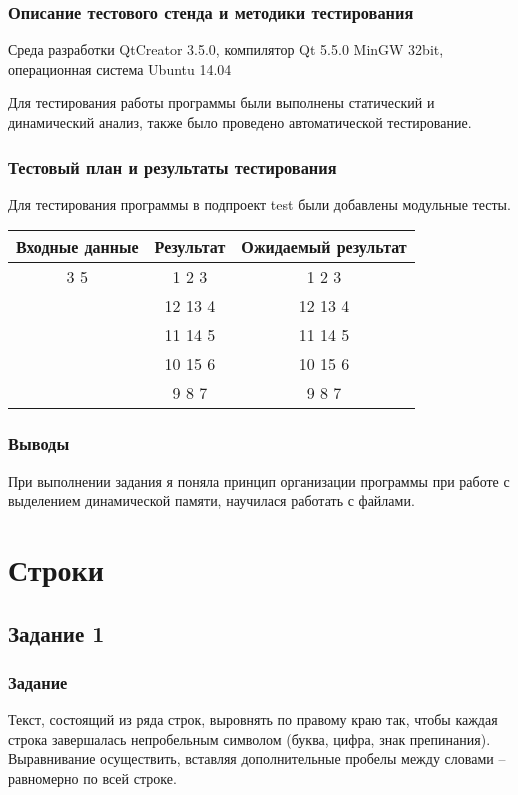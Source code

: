 \documentclass[12pt,a4paper]{report}
\begin{document}
\subsection{Описание тестового стенда и методики тестирования}
Среда разработки QtCreator 3.5.0, компилятор Qt 5.5.0 MinGW 32bit, операционная система Ubuntu 14.04

Для тестирования работы программы были выполнены статический и динамический анализ, также было проведено автоматической тестирование.
\subsection{Тестовый план и результаты тестирования}
Для тестирования программы в подпроект test были добавлены модульные тесты. 


 \begin{tabular}{|c|c|c|}
 	\hline 	
 	Входные данные & Результат & Ожидаемый  результат \\
 	\hline
	3 5 &  1  2 3 &  1  2 3 \\
	& 12 13 4 & 12 13 4 \\
	& 11 14 5 & 11 14 5 \\
	& 10 15 6 & 10 15 6 \\
	&  9  8 7 &  9  8 7 \\   
 	\hline
 \end{tabular}

\subsection{Выводы}
При выполнении задания я поняла принцип организации программы при работе с выделением динамической памяти, научилася работать с файлами.

%

%

\chapter{Строки}
\section{Задание 1}
\subsection{Задание}
Текст, состоящий из ряда строк, выровнять по правому краю так, чтобы каждая строка завершалась непробельным символом (буква, цифра, знак препинания). Выравнивание осуществить, вставляя дополнительные пробелы между словами – равномерно по всей строке.
	
\end{document}
